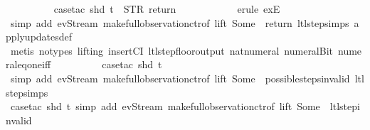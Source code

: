 \begin{isabellebody}
\ \ \ \ \ \ \ \ \isamarkupfalse%
\ {\isacharparenleft}case{\isacharunderscore}tac\ {\isachardoublequoteopen}shd\ t\ {\isacharequal}\ {\isacharparenleft}STR\ {\isacharprime}{\isacharprime}return{\isacharprime}{\isacharprime}{\isacharcomma}\ {\isacharbrackleft}{\isacharbrackright}{\isacharparenright}{\isachardoublequoteclose}{\isacharparenright}\isanewline
\ \ \ \ \ \ \ \ \ \isamarkupfalse%
\ {\isacharparenleft}erule\ exE{\isacharparenright}\isanewline
\ \ \ \ \ \ \ \ \ \isamarkupfalse%
\ {\isacharparenleft}simp\ add{\isacharcolon}\ ev{\isacharunderscore}Stream\ make{\isacharunderscore}full{\isacharunderscore}observation{\isachardot}ctr{\isacharbrackleft}of\ lift\ {\isachardoublequoteopen}Some\ {}{\isachardoublequoteclose}{\isacharbrackright}\ return\ ltl{\isacharunderscore}step{\isachardot}simps\ apply{\isacharunderscore}updates{\isacharunderscore}def{\isacharparenright}\isanewline
\ \ \ \ \ \ \ \ \ \isamarkupfalse%
\ {\isacharparenleft}metis\ {\isacharparenleft}no{\isacharunderscore}types{\isacharcomma}\ lifting{\isacharparenright}\ insertCI\ ltl{\isacharunderscore}step{\isacharunderscore}floor{\isacharunderscore}output\ nat{\isacharunderscore}numeral\ numeral{\isacharunderscore}Bit{}\ numeral{\isacharunderscore}eq{\isacharunderscore}one{\isacharunderscore}iff{\isacharparenright}\isanewline
\isanewline
\ \ \ \ \ \ \ \ \isamarkupfalse%
\ {\isacharparenleft}case{\isacharunderscore}tac\ {\isachardoublequoteopen}shd\ t{\isachardoublequoteclose}{\isacharparenright}\isanewline
\ \ \ \ \ \ \ \ \isamarkupfalse%
\ {\isacharparenleft}simp\ add{\isacharcolon}\ ev{\isacharunderscore}Stream\ make{\isacharunderscore}full{\isacharunderscore}observation{\isachardot}ctr{\isacharbrackleft}of\ lift\ {\isachardoublequoteopen}Some\ {}{\isachardoublequoteclose}{\isacharbrackright}\ possible{\isacharunderscore}steps{\isacharunderscore}{}{\isacharunderscore}invalid\ ltl{\isacharunderscore}step{\isachardot}simps{\isacharparenright}\isanewline
\isanewline
\ \ \ \ \ \ \ \isamarkupfalse%
\ {\isacharparenleft}case{\isacharunderscore}tac\ {\isachardoublequoteopen}shd\ t{\isachardoublequoteclose}{\isacharcomma}\ simp\ add{\isacharcolon}\ ev{\isacharunderscore}Stream\ make{\isacharunderscore}full{\isacharunderscore}observation{\isachardot}ctr{\isacharbrackleft}of\ lift\ {\isachardoublequoteopen}Some\ {}{\isachardoublequoteclose}{\isacharbrackright}\ ltl{\isacharunderscore}step{\isacharunderscore}{}{\isacharunderscore}invalid{\isacharparenright}\isanewline

\end{isabellebody}
